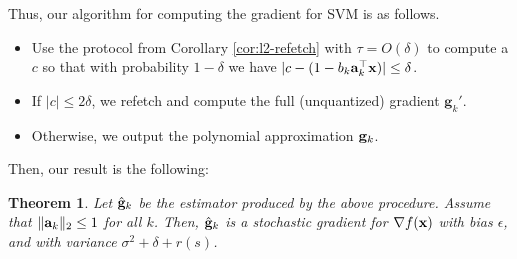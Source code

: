 \documentclass{article}
\renewcommand{\vec}[1]{\mathbf{#1}}
\def\a{{\bf a}}
\def\g{{\bf g}}
\def\x{{\bf x}}
\newtheorem{theorem}{Theorem}
\begin{document}
Thus, our algorithm for computing the gradient for SVM is as follows.
\begin{itemize}
\item
Use the protocol from Corollary \ref{cor:l2-refetch} with $\tau = O(\delta)$ to compute a $c$  so that with probability $1 - \delta$ we have $|c - (1 - b_k \a_k^\top \x) | \leq \delta$.
\item
If $|c| \leq 2 \delta$, we refetch and compute the full (unquantized) gradient $\vec{g}_k'$.
\item
Otherwise, we output the polynomial approximation $\g_k$.
\end{itemize}
Then, our result is the following:
\begin{theorem}
Let $\hat{\g}_k$ be the estimator produced by the above procedure.
Assume that $\| \a_k \|_2 \leq 1$ for all $k$.
Then, $\hat{\g}_k$ is a stochastic gradient for $\nabla f(\x)$ with bias $\epsilon$, and with variance $\sigma^2 + \delta + r(s)$.
\end{theorem}
\end{document}
